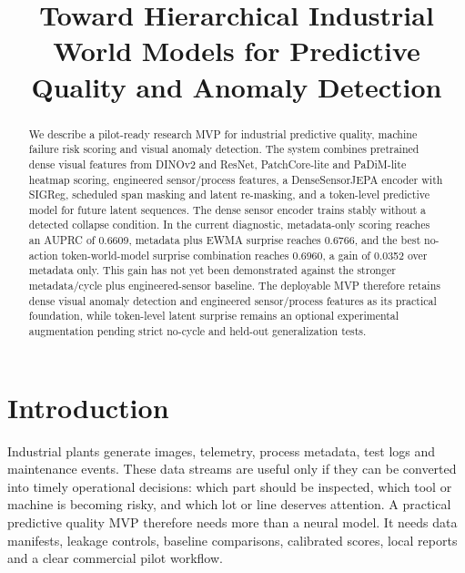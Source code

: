 \documentclass[10pt,conference]{IEEEtran}
\title{Toward Hierarchical Industrial World Models for Predictive Quality and Anomaly Detection}
\author{\IEEEauthorblockN{EVOCON Solutions Research Group}}
\begin{document}
\begin{center}
\end{center}
\maketitle

\begin{abstract}
We describe a pilot-ready research MVP for industrial predictive quality, machine failure risk scoring and visual anomaly detection. The system combines pretrained dense visual features from DINOv2 and ResNet, PatchCore-lite and PaDiM-lite heatmap scoring, engineered sensor/process features, a DenseSensorJEPA encoder with SIGReg, scheduled span masking and latent re-masking, and a token-level predictive model for future latent sequences. The dense sensor encoder trains stably without a detected collapse condition. In the current diagnostic, metadata-only scoring reaches an AUPRC of 0.6609, metadata plus EWMA surprise reaches 0.6766, and the best no-action token-world-model surprise combination reaches 0.6960, a gain of 0.0352 over metadata only. This gain has not yet been demonstrated against the stronger metadata/cycle plus engineered-sensor baseline. The deployable MVP therefore retains dense visual anomaly detection and engineered sensor/process features as its practical foundation, while token-level latent surprise remains an optional experimental augmentation pending strict no-cycle and held-out generalization tests.
\end{abstract}

\section{Introduction}
Industrial plants generate images, telemetry, process metadata, test logs and maintenance events. These data streams are useful only if they can be converted into timely operational decisions: which part should be inspected, which tool or machine is becoming risky, and which lot or line deserves attention. A practical predictive quality MVP therefore needs more than a neural model. It needs data manifests, leakage controls, baseline comparisons, calibrated scores, local reports and a clear commercial pilot workflow.
\end{document}
